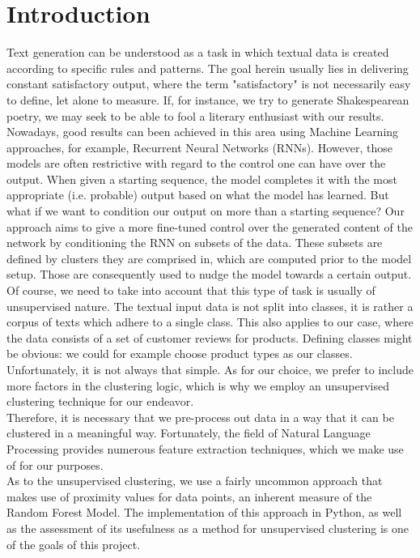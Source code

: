 \documentclass[]{report}
\begin{document}
\chapter{Introduction}
Text generation can be understood as a task in which textual data is created according to specific rules and patterns. The goal herein usually lies in delivering constant satisfactory output, where the term "satisfactory" is not necessarily easy to define, let alone to measure. If, for instance, we try to generate Shakespearean poetry, we may seek to be able to fool a literary enthusiast with our results. Nowadays, good results can been achieved in this area using Machine Learning approaches, for example, Recurrent Neural Networks (RNNs)\cite{karpathy}. However, those models are often restrictive with regard to the control one can have over the output. When given a starting sequence, the model completes it with the most appropriate (i.e. probable) output based on what the model has learned. But what if we want to condition our output on more than a starting sequence? Our approach aims to give a more fine-tuned control over the generated content of the network by conditioning the RNN on subsets of the data. These subsets are defined by clusters they are comprised in, which are computed prior to the model setup. Those are consequently used to nudge the model towards a certain output. \\
Of course, we need to take into account that this type of task is usually of unsupervised nature. The textual input data is not split into classes, it is rather a corpus of texts which adhere to a single class. This also applies to our case, where the data consists of a set of customer reviews for products. Defining classes might be obvious: we could for example choose product types as our classes. Unfortunately, it is not always that simple. As for our choice, we prefer to include more factors in the clustering logic, which is why we employ an unsupervised clustering technique for our endeavor. \\
Therefore, it is necessary that we pre-process out data in a way that it can be clustered in a meaningful way. Fortunately, the field of Natural Language Processing provides numerous feature extraction techniques, which we make use of for our purposes. \\
As to the unsupervised clustering, we use a fairly uncommon approach that makes use of proximity values for data points, an inherent measure of the Random Forest Model. The implementation of this approach in Python, as well as the assessment of its usefulness as a method for unsupervised clustering is one of the goals of this project.
\end{document}
